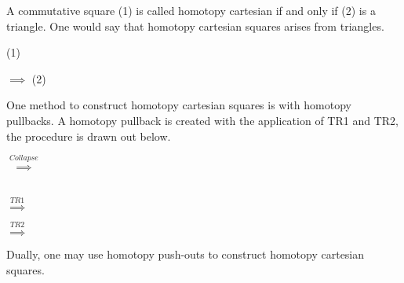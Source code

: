    \begin{definition}
         A commutative square (1) is called homotopy cartesian if and only if (2) is a triangle. One would say that homotopy cartesian squares arises from triangles.
        \begin{center}
            (1)
            $\implies$
            (2)
        \end{center}
    \end{definition}
        
    \begin{remark}
        One method to construct homotopy cartesian squares is with homotopy pullbacks. A homotopy pullback is created with the application of TR1 and TR2, the procedure is drawn out below.
        \begin{center}
            $\stackrel{Collapse}{\implies}$
             \\
            $\stackrel{TR1}{\implies}$
            $\stackrel{TR2}{\implies}$
        \end{center}

        Dually, one may use homotopy push-outs to construct homotopy cartesian squares.
    \end{remark}

